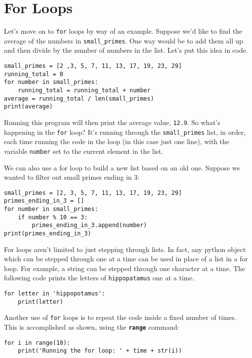 \section*{For Loops}

Let's move on to \texttt{for} loops by way of an example. Suppose we'd like to find the average of the numbers in \texttt{small\_primes}. One way would be to add them all up and then divide by the number of numbers in the list. Let's put this idea in code.

\begin{lstlisting}
small_primes = [2 ,3, 5, 7, 11, 13, 17, 19, 23, 29]
running_total = 0
for number in small_primes:
	running_total = running_total + number
average = running_total / len(small_primes)
print(average)
\end{lstlisting}

Running this program will then print the average value, \texttt{12.9}. So what's happening in the \texttt{for} loop? It's running through the \texttt{small\_primes} list, in order, each time running the code in the loop (in this case just one line), with the variable \texttt{number} set to the current element in the list.

We can also use a for loop to build a new list based on an old one. Suppose we wanted to filter out small primes ending in 3:

\begin{lstlisting}
small_primes = [2, 3, 5, 7, 11, 13, 17, 19, 23, 29]
primes_ending_in_3 = []
for number in small_primes:
	if number % 10 == 3:
		primes_ending_in_3.append(number)
print(primes_ending_in_3)
\end{lstlisting}

For loops aren't limited to just stepping through lists. In fact, any python object which can be stepped through one at a time can be used in place of a list in a for loop. For example, a string can be stepped through one character at a time. The following code prints the letters of \texttt{\textquotesingle hippopatamus\textquotesingle} one at a time.

\begin{lstlisting}
for letter in 'hippopotamus':
	print(letter)
\end{lstlisting}

Another use of \texttt{for} loops is to repeat the code inside a fixed number of times. This is accomplished as shown, using the \texttt{\textbf{range}} command:

\begin{lstlisting}
for i in range(10):
	print('Running the for loop: ' + time + str(i))
\end{lstlisting}

